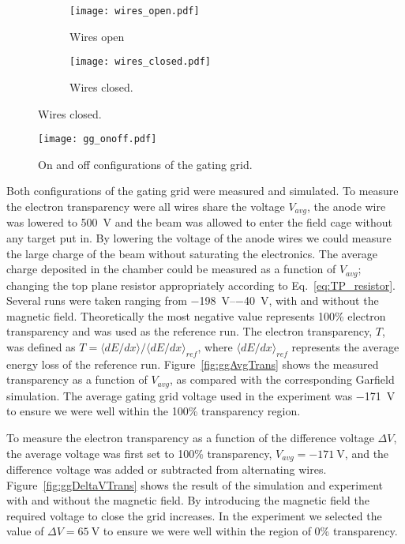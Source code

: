 \begin{figure}[!htb]
    \centering
    \begin{subfigure}[t]{0.49\textwidth}
        \centering
        \texttt{[image: wires\_open.pdf]} 
        \caption{Wires open} \label{fig:wires_open}
    \end{subfigure}
    \hfill
    \begin{subfigure}[t]{0.42\textwidth}
        \centering
        \texttt{[image: wires\_closed.pdf]} 
        \caption{Wires closed.} \label{fig:wires_closed}
    \end{subfigure}
\label{fig:wires}
\end{figure}



\begin{figure}[!htb]
\centering
\texttt{[image: gg\_onoff.pdf]}
\caption{On and off configurations of the gating grid.}
\label{fig:gg_onoff}
\end{figure}


Both configurations of the gating grid were measured and simulated. To measure the electron transparency were all wires share the voltage $V_{avg}$, the anode wire was lowered to \SI{500}{\volt} and the beam was allowed to enter the field cage without any target put in. By lowering the voltage of the anode wires we could measure the large charge of the beam without saturating the electronics. The average charge deposited in the chamber could be measured as a function of $V_{avg}$; changing the top plane resistor appropriately according to Eq.~\ref{eq:TP_resistor}. Several runs were taken ranging from \SIrange{-198}{-40}{\volt}, with and without the magnetic field. Theoretically the most negative value represents 100\% electron transparency and was used as the reference run. The electron transparency, $T$, was defined as $T = \langle dE/dx\rangle/{\langle dE/dx\rangle}_{ref}$, where $\langle dE/dx\rangle_{ref}$ represents the average energy loss of the reference run. Figure~\ref{fig:ggAvgTrans} shows the measured transparency as a function of $V_{avg}$, as compared with the corresponding Garfield simulation. The average gating grid voltage used in the experiment was \SI{-171}{\volt} to ensure we were well within the 100\% transparency region. 

To measure the electron transparency as a function of the difference voltage $\Delta V$, the average voltage was first set to 100\% transparency, $V_{avg}=\SI{-171}{\volt}$, and the difference voltage was added or subtracted from alternating wires. Figure~\ref{fig:ggDeltaVTrans} shows the result of the simulation and experiment with and without the magnetic field. By introducing the magnetic field the required voltage to close the grid increases. In the experiment we selected the value of $\Delta V = \SI{65}{\volt}$ to ensure we were well within the region of 0\% transparency.  

